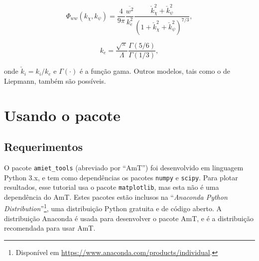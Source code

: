 \documentclass[a4paper, 11pt, twoside]{article}
\begin{document}
\begin{equation}
\Phi_{ww}(k_\chi, k_\psi) = \frac{4}{9 \pi} \frac{\overline{w^2}}{k_e^2} \frac{\check{k}_\chi^2 + \check{k}_\psi^2}{\left(1 + \check{k}_\chi^2 + \check{k}_\psi^2 \right)^{7/3}},
\label{eq:vonKarmanModel}
\end{equation}

\begin{equation}
k_e = \frac{\sqrt{\pi}}{\Lambda} \frac{\Gamma (5/6)}{\Gamma (1/3)},
\end{equation}

\noindent onde $\check{k}_i = k_i/k_e$ e $\Gamma (\cdot)$ é a função gama. Outros modelos, tais como o de Liepmann, também são possíveis.




\clearpage
\newpage
\section{Usando o pacote}

\subsection{Requerimentos}

O pacote \verb|amiet_tools| (abreviado por ``AmT'') foi desenvolvido em linguagem Python 3.x, e tem como dependências os pacotes \verb|numpy| e \verb|scipy|. Para plotar resultados, esse tutorial usa o pacote \verb|matplotlib|, mas esta não é uma dependência do AmT. Estes pacotes estão inclusos na ``\emph{Anaconda Python Distribution}''\footnote{Disponível em \url{https://www.anaconda.com/products/individual}.}, uma distribuição Python gratuita e de código aberto. A distribuição Anaconda é usada para desenvolver o pacote AmT, e é a distribuição recomendada para usar AmT.

\end{document}
